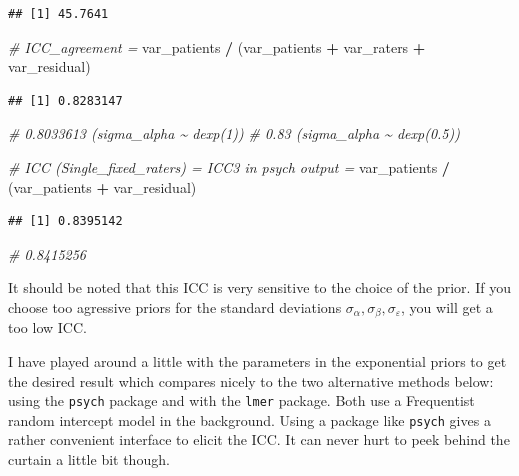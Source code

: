 \documentclass[
]{article}
\newenvironment{Shaded}{\begin{snugshade}}{\end{snugshade}}
\newcommand{\CommentTok}[1]{\textcolor[rgb]{0.56,0.35,0.01}{\textit{#1}}}
\newcommand{\NormalTok}[1]{#1}
\newcommand{\SpecialCharTok}[1]{\textcolor[rgb]{0.81,0.36,0.00}{\textbf{#1}}}
\begin{document}
\begin{verbatim}
## [1] 45.7641
\end{verbatim}

\begin{Shaded}
\begin{Highlighting}[]
\CommentTok{\# ICC\_agreement = }
\NormalTok{var\_patients }\SpecialCharTok{/}\NormalTok{ (var\_patients }\SpecialCharTok{+}\NormalTok{ var\_raters }\SpecialCharTok{+}\NormalTok{ var\_residual)}
\end{Highlighting}
\end{Shaded}

\begin{verbatim}
## [1] 0.8283147
\end{verbatim}

\begin{Shaded}
\begin{Highlighting}[]
\CommentTok{\# 0.8033613 (sigma\_alpha \textasciitilde{} dexp(1))}
\CommentTok{\# 0.83 (sigma\_alpha \textasciitilde{} dexp(0.5))}

\CommentTok{\# ICC (Single\_fixed\_raters) = ICC3 in psych output = }
\NormalTok{var\_patients }\SpecialCharTok{/}\NormalTok{ (var\_patients }\SpecialCharTok{+}\NormalTok{ var\_residual)}
\end{Highlighting}
\end{Shaded}

\begin{verbatim}
## [1] 0.8395142
\end{verbatim}

\begin{Shaded}
\begin{Highlighting}[]
\CommentTok{\# 0.8415256}
\end{Highlighting}
\end{Shaded}

It should be noted that this ICC is very sensitive to the choice of the prior.
If you choose too agressive priors for the standard deviations \(\sigma_{\alpha},
\sigma_{\beta}, \sigma_{\varepsilon}\), you will get a too low ICC.

I have played around a little with the parameters in the exponential priors
to get the desired result which compares nicely to the two alternative methods below:
using the \texttt{psych} package and with the \texttt{lmer}
package. Both use a Frequentist random intercept model in the background.
Using a package like \texttt{psych} gives a rather convenient interface to
elicit the ICC. It can never hurt to peek behind the curtain a little bit though.
\end{document}
